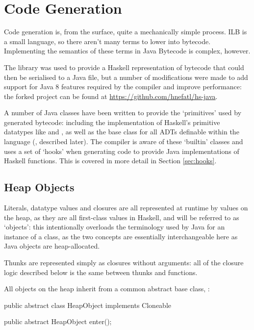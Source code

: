 \documentclass[dissertation.tex]{subfiles}
\begin{document}
\section{Code Generation}
{
    Code generation is, from the surface, quite a mechanically simple process. ILB is a small language, so there aren't many terms to lower into bytecode. Implementing the semantics of these terms in Java Bytecode is complex, however.

    The  library was used to provide a Haskell representation of bytecode that could then be serialised to a Java  file, but a number of modifications were made to add support for Java 8 features required by the compiler and improve performance: the forked project can be found at \url{https://github.com/hnefatl/hs-java}.

    A number of Java classes have been written to provide the `primitives' used by generated bytecode: including the implementation of Haskell's primitive datatypes like  and , as well as the base class for all ADTs definable within the language (, described later). The compiler is aware of these `builtin' classes and uses a set of `hooks' when generating code to provide Java implementations of Haskell functions. This is covered in more detail in Section \ref{sec:hooks}.

    \subsection{Heap Objects}\label{sec:heap-objects}
    {

        Literals, datatype values and closures are all represented at runtime by values on the heap, as they are all first-class values in Haskell, and will be referred to as `objects': this intentionally overloads the terminology used by Java for an instance of a class, as the two concepts are essentially interchangeable here as Java objects are heap-allocated.

        Thunks are represented simply as closures without arguments: all of the closure logic described below is the same between thunks and functions.

        All objects on the heap inherit from a common abstract base class, :

        \begin{javafigure}
        public abstract class HeapObject implements Cloneable {
            public abstract HeapObject enter();

}
\end{javafigure}}}
\end{document}
